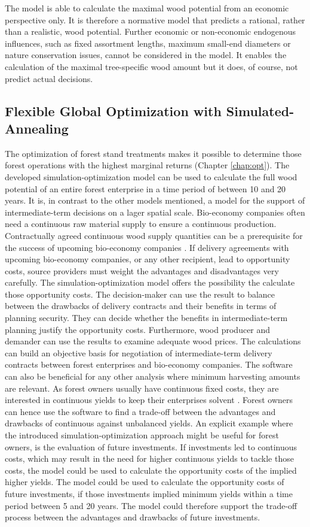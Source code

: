 The model is able to calculate the maximal wood potential from an economic perspective only. It is therefore a normative model that predicts a rational, rather than a realistic, wood potential. Further economic or non-economic endogenous influences, such as fixed assortment lengths, maximum small-end diameters or nature conservation issues, cannot be considered in the model. It enables the calculation of the maximal tree-specific wood amount but it does, of course, not predict actual decisions.

\subsection{Flexible Global Optimization with Simulated-Annealing}
\label{subsec:discussion:struct:opt}
The optimization of forest stand treatments makes it possible to determine those forest operations with the highest marginal returns (Chapter \ref{chap:opt}). The developed simulation-optimization model can be used to calculate the full wood potential of an entire forest enterprise in a time period of between 10 and 20 years. It is, in contrast to the other models mentioned, a model for the support of intermediate-term decisions on a lager spatial scale. Bio-economy companies often need a continuous raw material supply to ensure a continuous production. Contractually agreed continuous wood supply quantities can be a prerequisite for the success of upcoming bio-economy companies \citep[p. 221, 223]{elchichakli_2016}. If delivery agreements with upcoming bio-economy companies, or any other recipient, lead to opportunity costs, source providers must weight the advantages and disadvantages very carefully. The simulation-optimization model offers the possibility the calculate those opportunity costs. The decision-maker can use the result to balance between the drawbacks of delivery contracts and their benefits in terms of planning security. They can decide whether the benefits in intermediate-term planning justify the opportunity costs. Furthermore, wood producer and demander can use the results to examine adequate wood prices. The calculations can build an objective basis for negotiation of intermediate-term delivery contracts between forest enterprises and bio-economy companies. The software can also be beneficial for any other analysis where minimum harvesting amounts are relevant. As forest owners usually have continuous fixed costs, they are interested in continuous yields to keep their enterprises solvent \citep[p. 74]{mohring_2010b}. Forest owners can hence use the software to find a trade-off between the advantages and drawbacks of continuous against unbalanced yields. An explicit example where the introduced simulation-optimization approach might be useful for forest owners, is the evaluation of future investments. If investments led to continuous costs, which may result in the need for higher continuous yields to tackle those costs, the model could be used to calculate the opportunity costs of the implied higher yields. The model could be used to calculate the opportunity costs of future investments, if those investments implied minimum yields within a time period between 5 and 20 years. The model could therefore support the trade-off process between the advantages and drawbacks of future investments.

